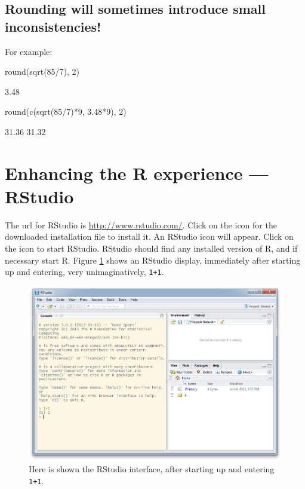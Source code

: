 \documentclass{tufte-book}\usepackage[]{graphicx}\usepackage[]{color}
\newcommand{\txtt}[1]{\texttt{#1}}
\begin{document}
\subsection*{Rounding will sometimes introduce small inconsistencies!}

For example:
\begin{Schunk}
\begin{Sinput}
round(sqrt(85/7), 2)
\end{Sinput}
\begin{Soutput}
[1] 3.48
\end{Soutput}
\begin{Sinput}
round(c(sqrt(85/7)*9,  3.48*9), 2)
\end{Sinput}
\begin{Soutput}
[1] 31.36 31.32
\end{Soutput}
\end{Schunk}

\section{Enhancing the R experience --- RStudio}\label{sec:RStudio}

The url for RStudio is \url{http://www.rstudio.com/}.  Click on the
icon for the downloaded installation file to install it. An RStudio
icon will appear.  Click on the icon to start RStudio.  RStudio should
find any installed version of R, and if necessary start R.  Figure
\ref{fig:rstudio} shows an RStudio display, immediately after starting
up and entering, very unimaginatively, \txtt{1+1}.

\begin{figure}
\includegraphics{figs-inc/03i-all4.png}
\caption{Here is shown the RStudio interface, after starting up and
  entering \txtt{1+1}.}\label{fig:rstudio}
\end{figure}
\pagebreak
\end{document}
